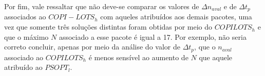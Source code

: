 Por fim, vale ressaltar que não deve-se comparar os valores de $ \Delta n_{aval} $ e de $ \Delta t_p $ associados ao $ COPI - LOTS_h $ com aqueles atribuídos aos demais pacotes, uma vez que somente três soluções distintas foram obtidas por meio do $ COPILOTS_h $ e que o máximo $ N $ associado a esse pacote é igual a 17. Por exemplo, não seria correto concluir, apenas por meio da análise do valor de $ \Delta t_p $, que o $ n_{aval} $ associado ao $ COPILOTS_h $ é menos sensível ao aumento de $ N $ que aquele atribuído ao $ PSOPT_l $.

